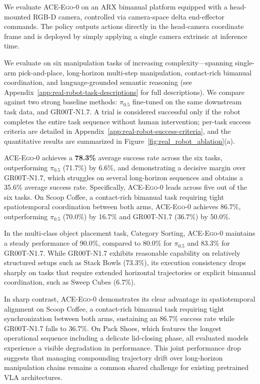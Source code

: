\documentclass{llmxive}
\providecommand{\OURS}{\textsc{ACE-Ego-0}\xspace}
\providecommand{\Ours}{\OURS}
\begin{document}
We evaluate \OURS on an ARX bimanual platform equipped with a head-mounted RGB-D camera, controlled via camera-space delta end-effector commands. 
The policy outputs actions directly in the head-camera coordinate frame and is deployed by simply applying a single camera extrinsic at inference time.

We evaluate on six manipulation tasks of increasing complexity—spanning single-arm pick-and-place, long-horizon multi-step manipulation, contact-rich bimanual coordination, and language-grounded semantic reasoning (see Appendix~\ref{app:real-robot-task-descriptions} for full descriptions). 
We compare against two strong baseline methods: $\pi_{0.5}$ fine-tuned on the same downstream task data, and GR00T-N1.7.
A trial is considered successful only if the robot completes the entire task sequence without human intervention; per-task success criteria are detailed in Appendix~\ref{app:real-robot-success-criteria}, and the quantitative results are summarized in Figure~\ref{fig:real_robot_ablation}(a).


\Ours achieves a \textbf{78.3\%} average success rate across the six tasks, outperforming $\pi_{0.5}$ (71.7\%) by 6.6\%, and demonstrating a decisive margin over GR00T-N1.7, which struggles on several long-horizon sequences and obtains a 35.6\% average success rate.
Specifically, \Ours leads across five out of the six tasks. On Scoop Coffee, a contact-rich bimanual task requiring tight spatiotemporal coordination between both arms, \Ours achieves 86.7\%, outperforming $\pi_{0.5}$ (70.0\%) by 16.7\% and GR00T-N1.7 (36.7\%) by 50.0\%.

In the multi-class object placement task, Category Sorting, \Ours maintains a steady performance of 90.0\%, compared to 80.0\% for $\pi_{0.5}$ and 83.3\% for GR00T-N1.7. While GR00T-N1.7 exhibits reasonable capability on relatively structured setups such as Stack Bowls (73.3\%), its execution consistency drops sharply on tasks that require extended horizontal trajectories or explicit bimanual coordination, such as Sweep Cubes (6.7\%).

In sharp contrast, \Ours demonstrates its clear advantage in spatiotemporal alignment on Scoop Coffee, a contact-rich bimanual task requiring tight synchronization between both arms, sustaining an 86.7\% success rate while GR00T-N1.7 falls to 36.7\%. On Pack Shoes, which features the longest operational sequence including a delicate lid-closing phase, all evaluated models experience a visible degradation in performance. This joint performance drop suggests that managing compounding trajectory drift over long-horizon manipulation chains remains a common shared challenge for existing pretrained VLA architectures.
\end{document}
